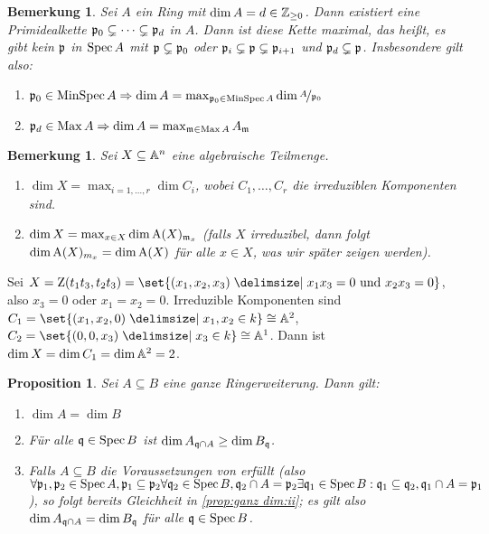 \documentclass[12pt,a4paper]{scrartcl}
\theoremstyle{cplain}
\newtheorem{prop}[thmcounter]{Proposition}
\theoremstyle{cdef}
\newtheorem{beme}[thmcounter]{Bemerkung}
\begin{document}
\begin{beme}
	Sei $A$ ein Ring mit $\dim A = d \in\mathbb Z_{\ge 0}$. Dann existiert eine Primidealkette $\mathfrak{p}_0\subsetneq \dots \subsetneq \mathfrak{p}_d$ in $A$. Dann ist diese Kette maximal, das heißt, es gibt kein $\mathfrak{p} $ in $\operatorname{Spec} A$ mit $\mathfrak{p}\subsetneq \mathfrak{p}_0$ oder $\mathfrak{p}_i\subsetneq \mathfrak{p}\subsetneq \mathfrak{p}_{i+1}$ und $\mathfrak{p}_d\subsetneq \mathfrak{p}$. Insbesondere gilt also:
	\begin{enumerate}
		\item $\mathfrak{p}_0\in\operatorname{MinSpec} A\Rightarrow \dim A= \max_{\mathfrak{p}_0\in \operatorname{MinSpec} A}\dim \nicefrac{A}{\mathfrak{p}_0}$
		\item $\mathfrak{p}_d\in \operatorname{Max} A\Rightarrow \dim A = \max_{\mathfrak{m}\in \operatorname{Max} A} A_{\mathfrak{m}}$
	\end{enumerate}
\end{beme}
\begin{beme}
	Sei $X\subseteq \mathbb A^n$ eine algebraische Teilmenge.
	\begin{enumerate}
		\item $\dim X = \max_{i = 1,\dots, r} \dim C_i$, wobei $C_1,\dots, C_r$ die irreduziblen Komponenten sind.
		\item $\dim X = \max_{x\in X}\dim \operatorname{A}(X)_{\mathfrak{m}_x}$ (falls $X$ irreduzibel, dann folgt $\dim \operatorname{A}(X)_{m_x} = \dim \operatorname{A}(X)$ für alle $x \in X$, was wir später zeigen werden).
	\end{enumerate}
\end{beme}
\begin{bsp}
	Sei $X  = \Z(t_1t_3, t_2t_3) = \set{(x_1,x_2,x_3)\given x_1x_3 = 0\text{ und } x_2x_3 = 0}$, also $x_3 = 0$ oder $x_1 = x_2 = 0$.
	Irreduzible Komponenten sind $C_1 = \set{(x_1,x_2, 0)\given x_1,x_2 \in k}\cong \IA^2$, $C_2 = \set{(0,0,x_3)\given x_3\in k}\cong \IA^1$. Dann ist $\dim X = \dim C_1 = \dim \mathbb A^2 = 2$.
\end{bsp}
\begin{prop} \label{prop:ganz dim}
	Sei $A\subseteq B$ eine ganze Ringerweiterung. Dann gilt:
	\begin{enumerate}
		\item $\dim A = \dim B$ \label{prop:ganz dim:i}
		\item Für alle $\mathfrak{q}\in\operatorname{Spec} B$ ist $\dim A_{\mathfrak{q}\cap A}\ge \dim B_{\mathfrak{q}}$. \label{prop:ganz dim:ii}
		\item Falls $A\subseteq B$ die Voraussetzungen von  erfüllt (also $\forall \mathfrak{p}_1, \mathfrak{p}_2\in \operatorname{Spec} A, \mathfrak{p}_1\subseteq \mathfrak{p}_2\forall \mathfrak{q}_2\in\operatorname{Spec} B, \mathfrak{q}_2\cap A = \mathfrak{p}_2\exists \mathfrak{q}_1\in\operatorname{Spec} B: \mathfrak{q}_1\subseteq \mathfrak{q}_2, \mathfrak{q}_1\cap A = \mathfrak{p}_1$), so folgt bereits Gleichheit in \ref{prop:ganz dim:ii}; es gilt also $\dim A_{\mathfrak{q}\cap A} =\dim B_{\mathfrak{q}}$ für alle $\mathfrak{q} \in \operatorname{Spec} B$. \label{prop:ganz dim:iii}
	\end{enumerate}
\end{prop}
\end{document}
